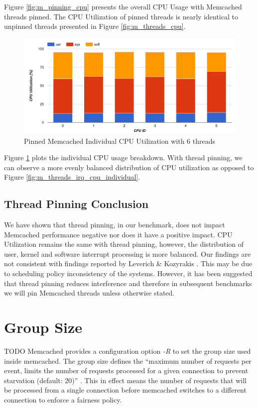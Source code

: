 Figure \ref{fig:m_pinning_cpu} presents the overall CPU Usage with Memcached threads pinned. The CPU Utilization of pinned threads is nearly identical to unpinned threads presented in Figure \ref{fig:m_threads_cpu}.

\begin{figure}[h]
    \includegraphics[width=\textwidth]{./res2/m_pinning_cpu_individual.png}
    \caption{Pinned Memcached Individual CPU Utilization with 6 threads}
    \label{fig:m_pinning_cpu_individual}
\end{figure}

Figure \ref{fig:m_pinning_cpu_individual} plots the individual CPU usage breakdown. With thread pinning, we can observe a more evenly balanced distribution of CPU utilization as opposed to Figure \ref{fig:m_threads_irq_cpu_individual}.

\subsection{Thread Pinning Conclusion}
We have shown that thread pinning, in our benchmark, does not impact Memcached performance negative nor does it have a positive impact. CPU Utilization remains the same with thread pinning, however, the distribution of user, kernel and software interrupt processing is more balanced. Our findings are not consistent with findings reported by Leverich \& Kozyrakis \cite{leverich2014reconciling}. This may be due to scheduling policy inconsistency of the systems. However, it has been suggested that thread pinning reduces interference and therefore in subsequent benchmarks we will pin Memcached threads unless otherwise stated.



\section{Group Size}
TODO
Memcached provides a configuration option \textit{-R} to set the group size used inside memcached. The group size defines the ``maximum number of requests per event, limits the number of requests processed for a given connection to prevent starvation (default: 20)'' \cite{interactive2006memcached}. This in effect means the number of requests that will be processed from a single connection before memcached switches to a different connection to enforce a fairness policy.

